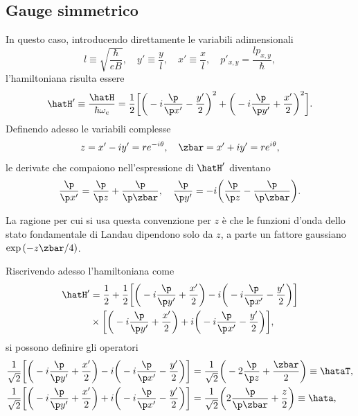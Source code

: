 \subsection{Gauge simmetrico}
In questo caso, introducendo direttamente le variabili adimensionali
\begin{equation}
    l \equiv \sqrt{\frac{\hbar}{eB}},\quad y' \equiv \frac{y}{l},\quad x' \equiv \frac{x}{l},\quad p'_{x,y} = \frac{lp_{x,y}}{\hbar},
\end{equation}
l'hamiltoniana risulta essere
\begin{equation}
    \hatH' \equiv \frac{\hatH}{\hbar\omega_c} = \frac{1}{2}\bigg[\bigg(-i\frac{\p}{\p x'} - \frac{y'}{2}\bigg)^2 + \bigg(-i\frac{\p}{\p y'} + \frac{x'}{2}\bigg)^2\bigg].
\end{equation}
Definendo adesso le variabili complesse
\begin{equation}
    z = x' - iy' = re^{-i\theta},\quad \zbar  = x' + iy' = re^{i\theta},
\end{equation}
le derivate che compaiono nell'espressione di $\hatH'$ diventano
\begin{equation}
    \frac{\p}{\p x'} = \frac{\p}{\p z} + \frac{\p}{\p \zbar },\quad \frac{\p}{\p y'} = -i\bigg(\frac{\p}{\p z} - \frac{\p}{\p \zbar }\bigg).
\end{equation}
\begin{notz}
    La ragione per cui si usa questa convenzione per $z$ è che le funzioni d'onda dello stato fondamentale di Landau dipendono solo da $z$, a parte un fattore gaussiano $\exp{(-z\zbar /4)}$.
\end{notz}
Riscrivendo adesso l'hamiltoniana come
\begin{equation}
    \begin{split}
        \hatH' &= \frac{1}{2} + \frac{1}{2}\bigg[\bigg(-i\frac{\p}{\p y'} + \frac{x'}{2}\bigg) - i\bigg(-i\frac{\p}{\p x'} - \frac{y'}{2}\bigg)\bigg] \\
        &\times\bigg[\bigg(-i\frac{\p}{\p y'} + \frac{x'}{2}\bigg) + i\bigg(-i\frac{\p}{\p x'} - \frac{y'}{2}\bigg)\bigg],
    \end{split}
\end{equation}
si possono definire gli operatori 
\begin{align}
    \frac{1}{\sqrt{2}}\bigg[\bigg(-i\frac{\p}{\p y'} + \frac{x'}{2}\bigg) - i\bigg(-i\frac{\p}{\p x'} - \frac{y'}{2}\bigg)\bigg] &= \frac{1}{\sqrt{2}}\bigg(-2\frac{\p}{\p z} + \frac{\zbar }{2}\bigg) \equiv \hataT, \\
    \frac{1}{\sqrt{2}}\bigg[\bigg(-i\frac{\p}{\p y'} + \frac{x'}{2}\bigg) + i\bigg(-i\frac{\p}{\p x'} - \frac{y'}{2}\bigg)\bigg] &= \frac{1}{\sqrt{2}}\bigg(2\frac{\p}{\p \zbar} + \frac{z}{2}\bigg) \equiv \hata,
\end{align}
